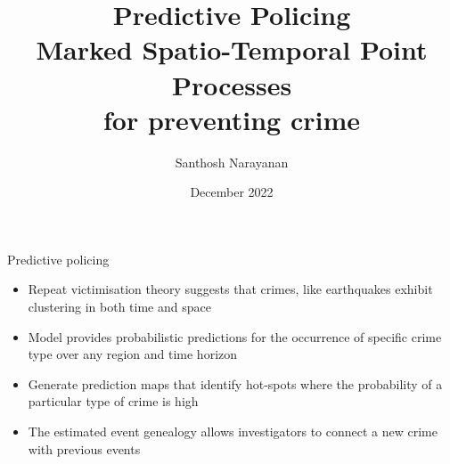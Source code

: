 \documentclass{beamer}
\title{Predictive Policing \\ \bigskip Marked Spatio-Temporal Point Processes \\ for preventing crime}
\author{Santhosh Narayanan}
\institute{}
\institute[PredPoint] %
{ 
  PredPoint Analytics
}
\date{December 2022}
\begin{document}
\begin{frame}
  \titlepage
\end{frame}



{

}

\begin{frame}{Predictive policing}
\begin{itemize}
    \item Repeat victimisation theory suggests that crimes, like earthquakes 
    exhibit clustering in both time and space\bigskip
    \item Model provides probabilistic predictions for the occurrence of 
    specific crime type over any region and time horizon\bigskip
    \item Generate prediction maps that identify hot-spots where the 
    probability of a particular type of crime is high \bigskip
    \item The estimated event genealogy allows investigators to connect a new 
    crime with previous events 
\end{itemize}  
\end{frame}
\end{document}
